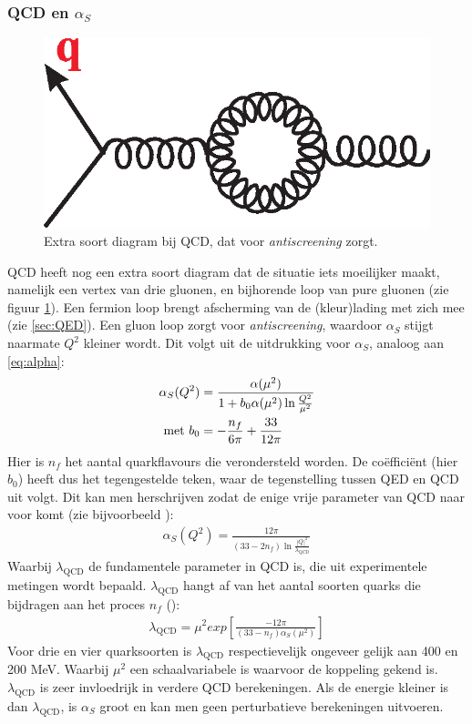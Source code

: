 \documentclass[a4paper,11pt]{article}
\numberwithin{equation}{section} %
\begin{document}
    \subsubsection{QCD en $\alpha_S$}
\begin{figure} [H]
  \begin{center}
    \includegraphics[scale=.33]{Afbeeldingen/GluonLoop.eps}
    \caption{Extra soort diagram bij QCD, dat voor \textit{antiscreening} zorgt. \cite{Martin}}
   \label{fig:GluonLoop}
  \end{center}
\end{figure}
QCD heeft nog een extra soort diagram dat de situatie iets moeilijker maakt, namelijk een vertex van drie gluonen, en bijhorende loop van pure gluonen (zie figuur \ref{fig:GluonLoop}).
Een fermion loop brengt afscherming van de (kleur)lading met zich mee (zie \ref{sec:QED}).
Een gluon loop zorgt voor \textit{antiscreening}, waardoor  $\alpha_S$ stijgt naarmate $Q^2$ kleiner wordt.
Dit volgt uit de uitdrukking voor $\alpha_S$, analoog aan \eqref{eq:alpha}:
\begin{align}
\alpha_S( Q^2 ) &=\frac{\alpha(\mu^2)}{1+b_0 \alpha(\mu^2) \ln{\frac{Q^2}{\mu^2}}} \\
\text{met } b_0 &= -\frac{n_f}{6\pi} + \frac{33}{12\pi} \notag
\end{align}
Hier is $n_f$ het aantal quarkflavours die verondersteld worden.
De coëfficiënt (hier $b_0$) heeft dus het tegengestelde teken, waar de tegenstelling tussen QED en QCD uit volgt.
Dit kan men herschrijven zodat de enige vrije parameter van QCD naar voor komt (zie bijvoorbeeld \cite[sectie 6.6]{Bettini}):
\begin{align} \label{eq:runningAlphaS}
\alpha_S(Q^2) = \frac{12\pi}{(33-2n_f) \ln{\frac{|Q|^2}{\lambda_\text{QCD}}}}
\end{align}
Waarbij $\lambda_\text{QCD}$ de fundamentele parameter in QCD is, die uit experimentele metingen wordt bepaald.
$\lambda_\text{QCD}$ hangt af van het aantal soorten quarks die bijdragen aan het proces $n_f$ (\cite[sectie 6.6]{Bettini}):
\begin{align}
\lambda_\text{QCD} = \mu^2 exp \left[ \frac{-12\pi}{(33-n_f) \alpha_S(\mu^2)} \right]
\end{align}
Voor drie en vier quarksoorten is $\lambda_\text{QCD}$ respectievelijk ongeveer gelijk aan 400 en 200 MeV.
Waarbij $\mu^2$ een schaalvariabele is waarvoor de koppeling gekend is.
$\lambda_\text{QCD}$ is zeer invloedrijk in verdere QCD berekeningen.
Als de energie kleiner is dan $\lambda_\text{QCD}$, is $\alpha_S$ groot en kan men geen perturbatieve berekeningen uitvoeren.
\end{document}

